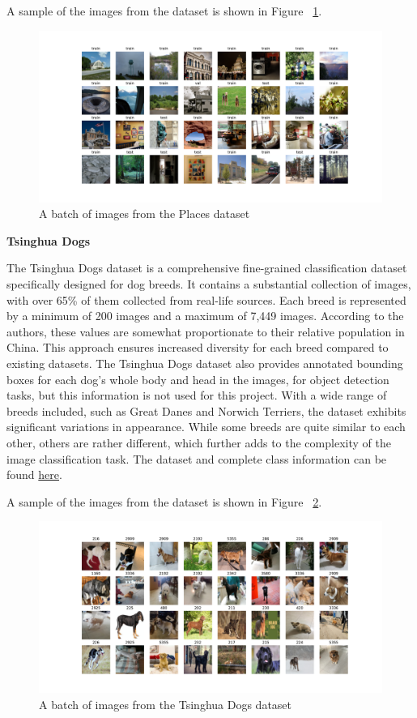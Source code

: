 \documentclass[a4paper,11pt,openright]{book}
\begin{document}
A sample of the images from the dataset is shown in Figure ~\ref{fig:places}.

\begin{figure}[!htb]
    \centering
    \includegraphics[width=1\textwidth]{images/places256.pdf}
    \caption{A batch of images from the Places dataset}
    \label{fig:places}
\end{figure}


\textbf{Tsinghua Dogs}

The Tsinghua Dogs dataset \cite{zouNewDatasetDog2020} is a comprehensive fine-grained classification dataset specifically designed for dog breeds. It contains a substantial collection of images, with over 65\% of them collected from real-life sources. Each breed is represented by a minimum of 200 images and a maximum of 7,449 images. According to the authors, these values are somewhat proportionate to their relative population in China. This approach ensures increased diversity for each breed compared to existing datasets. The Tsinghua Dogs dataset also provides annotated bounding boxes for each dog's whole body and head in the images, for object detection tasks, but this information is not used for this project. With a wide range of breeds included, such as Great Danes and Norwich Terriers, the dataset exhibits significant variations in appearance. While some breeds are quite similar to each other, others are rather different, which further adds to the complexity of the image classification task. 
The dataset and complete class information can be found \href{https://cg.cs.tsinghua.edu.cn/ThuDogs/}{here}.

A sample of the images from the dataset is shown in Figure ~\ref{fig:tsing}.

\begin{figure}[!htb]
    \centering
    \includegraphics[width=1\textwidth]{images/tsing.pdf}
    \caption{A batch of images from the Tsinghua Dogs dataset}
    \label{fig:tsing}
\end{figure}
\end{document}
